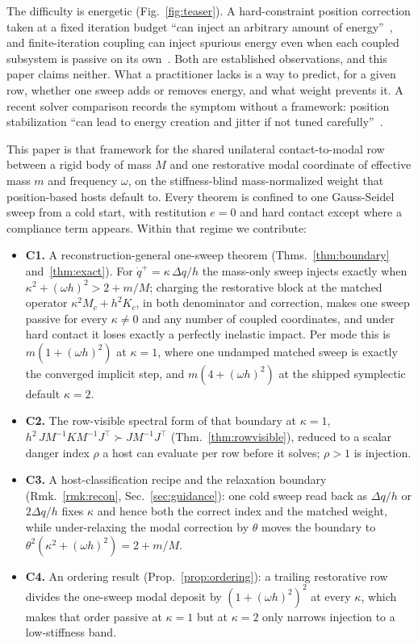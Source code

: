 \documentclass[sigconf,screen,review,anonymous]{acmart}
\newcommand{\oh}{\omega h}
\theoremstyle{acmdefinition}
\begin{document}
The difficulty is energetic (Fig.~\ref{fig:teaser}). A hard-constraint position
correction taken at a
fixed iteration budget ``can inject an arbitrary amount of
energy''~\citep{giles2025rtl}, and finite-iteration coupling can inject
spurious energy even when each coupled subsystem is passive on its
own~\citep{wei2026earlyterm}. Both are established observations, and this paper
claims neither. What a practitioner lacks is a way to predict, for a given row,
whether one sweep adds or removes energy, and what weight prevents it. A recent
solver comparison records the symptom without a framework: position
stabilization ``can lead to energy creation and jitter if not tuned
carefully''~\citep{catto2024solver2d}.

This paper is that framework for the shared unilateral contact-to-modal
row between a rigid body of mass $M$ and one restorative modal coordinate of
effective mass $m$ and frequency $\omega$, on the stiffness-blind
mass-normalized weight that position-based hosts default to. Every theorem
is confined to one Gauss-Seidel sweep from a cold start, with restitution
$e = 0$ and hard contact except where a compliance term appears.
Within that regime we contribute:

\begin{itemize}
\setlength{\itemsep}{0pt}\setlength{\parskip}{0pt}\setlength{\topsep}{2pt}
\item \textbf{C1.} A reconstruction-general one-sweep theorem
  (Thms.~\ref{thm:boundary} and~\ref{thm:exact}). For $\dot q^{+} =
  \kappa\,\Delta q/h$ the mass-only sweep injects exactly when $\kappa^2 +
  (\oh)^2 > 2 + m/M$; charging the restorative block at the matched operator
  $\kappa^2 M_c + h^2 K_c$, in both denominator and correction, makes one
  sweep passive for every $\kappa \neq 0$ and any number of coupled coordinates,
  and under hard contact it loses exactly a perfectly inelastic impact. Per mode this is
  $m(1 + (\oh)^2)$ at $\kappa = 1$, where one undamped matched sweep is exactly
  the converged implicit step, and $m(4 + (\oh)^2)$ at the shipped
  symplectic default
  $\kappa = 2$.
\item \textbf{C2.} The row-visible spectral form of that boundary at $\kappa = 1$,
  $h^2\,J M^{-1} K M^{-1} J^{\top} \succ J M^{-1} J^{\top}$
  (Thm.~\ref{thm:rowvisible}), reduced to a scalar danger index $\rho$ a host can
  evaluate per row before it solves; $\rho > 1$ is injection.
\item \textbf{C3.} A host-classification recipe and the relaxation boundary
  (Rmk.~\ref{rmk:recon}, Sec.~\ref{sec:guidance}): one cold sweep read back as
  $\Delta q/h$ or $2\Delta q/h$ fixes $\kappa$ and hence both the correct index
  and the matched weight, while under-relaxing the modal correction by $\theta$
  moves the boundary to $\theta^2(\kappa^2 + (\oh)^2) = 2 + m/M$.
\item \textbf{C4.} An ordering result (Prop.~\ref{prop:ordering}): a trailing
  restorative row divides the one-sweep modal deposit by $(1 + (\oh)^2)^2$ at
  every $\kappa$, which makes that order passive at $\kappa = 1$ but at
  $\kappa = 2$ only narrows injection to a low-stiffness band.
\end{itemize}
\end{document}

